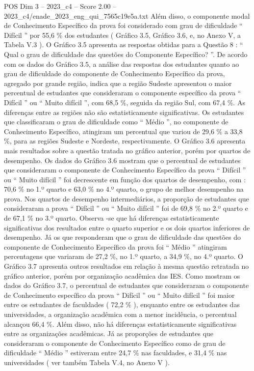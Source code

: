 \begin{textsample}{POS Dim 3 – 2023\_c4 – Score 2.00 – 2023\_c4/enade\_2023\_eng\_qui\_7565c19e5a.txt}
Além disso, o componente modal de Conhecimento Específico da prova foi considerado com grau de dificuldade “ Difícil ” por 55,6 \% dos estudantes ( Gráfico 3.5, Gráfico 3.6, e, no Anexo V, a Tabela V.3 ).
O Gráfico 3.5 apresenta as respostas obtidas para a Questão 8 : “ Qual o grau de dificuldade das questões do Componente Específico? ”.
De acordo com os dados do Gráfico 3.5, a análise das respostas dos estudantes quanto ao grau de dificuldade do componente de Conhecimento Específico da prova, agregado por grande região, indica que a região Sudeste apresentou o maior percentual de estudantes que consideraram o componente específico da prova “ Difícil ” ou “ Muito difícil ”, com 68,5 \%, seguida da região Sul, com 67,4 \%.
As diferenças entre as regiões não são estatisticamente significativas.
Os estudantes que classificaram o grau de dificuldade como “ Médio ”, no componente de Conhecimento Específico, atingiram um percentual que variou de 29,6 \% a 33,8 \%, para as regiões Sudeste e Nordeste, respectivamente.
O Gráfico 3.6 apresenta mais resultados sobre a questão tratada no gráfico anterior, porém por quartos de desempenho.
Os dados do Gráfico 3.6 mostram que o percentual de estudantes que consideraram o componente de Conhecimento Específico da prova “ Difícil ” ou “ Muito difícil ” foi decrescente em função dos quartos de desempenho, com : 70,6 \% no 1.º quarto e 63,0 \% no 4.º quarto, o grupo de melhor desempenho na prova.
Nos quartos de desempenho intermediários, a proporção de estudantes que consideraram a prova “ Difícil ” ou “ Muito difícil ” foi de 69,8 \% no 2.º quarto e de 67,1 \% no 3.º quarto.
Observa -se que há diferenças estatisticamente significativas dos resultados entre o quarto superior e os dois quartos inferiores de desempenho.
Já os que responderam que o grau de dificuldade das questões do componente de Conhecimento Específico da prova foi “ Médio ” atingiram percentagens que variaram de 27,2 \%, no 1.º quarto, a 34,9 \%, no 4.º quarto.
O Gráfico 3.7 apresenta outros resultados em relação à mesma questão retratada no gráfico anterior, porém por organização acadêmica das IES.
Como mostram os dados do Gráfico 3.7, o percentual de estudantes que consideraram o componente de Conhecimento específico da prova “ Difícil ” ou “ Muito difícil ” foi maior entre os estudantes de faculdades ( 72,2 \% ), enquanto entre os estudantes das universidades, a organização acadêmica com a menor incidência, o percentual alcançou 66,4 \%.
Além disso, não há diferenças estatisticamente significativas entre as organizações acadêmicas.
Já as proporções de estudantes que consideraram o componente de Conhecimento Específico como de grau de dificuldade “ Médio ” estiveram entre 24,7 \% nas faculdades, e 31,4 \% nas universidades ( ver também Tabela V.4, no Anexo V ).

\end{textsample}

